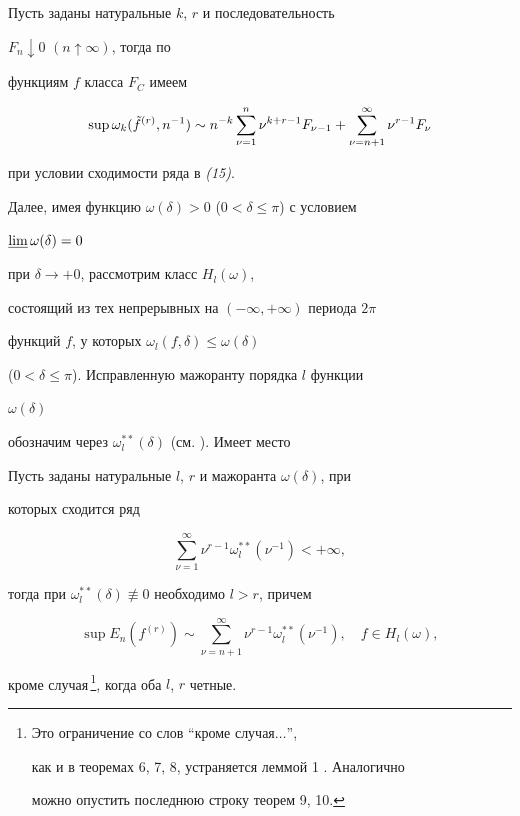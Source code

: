 \begin{thm}


Пусть заданы натуральные $k$, $r$ и последовательность


$F_n\downarrow 0$ $(n\uparrow \infty)$, тогда по


функциям $f$ класса $F_C$ имеем


\begin{equation}


\sup\omega_k(\Tilde f^{(r)},n^{-1})\sim n^{-k}\sum^n_{\nu=1}


\nu^{k+r-1}F_{\nu-1}+\sum^\infty_{\nu=n+1}\nu^{r-1}F_\nu


\end{equation}


при условии сходимости ряда в {\em (15)}.


\end{thm}





Далее, имея функцию $\omega(\delta)>0$ ($0<\delta\le\pi$) с условием


$\varliminf\omega(\delta)=0$


при $\delta\to+0$, рассмотрим класс $H_l(\omega)$,


состоящий из тех непрерывных на $(-\infty,+\infty)$ периода $2\pi$


функций $f$, у которых $\omega_l(f,\delta)\le\omega(\delta)$


($0<\delta\le\pi$). Исправленную мажоранту порядка $l$ функции


$\omega(\delta)$


обозначим через $\omega^{**}_l(\delta)$ (см. \cite{St}). Имеет место





\begin{thm}


Пусть заданы натуральные $l$, $r$ и мажоранта $\omega(\delta)$, при


которых сходится ряд


\begin{equation}


\sum^\infty_{\nu=1}\nu^{r-1}\omega^{**}_l(\nu^{-1})<+\infty,


\end{equation}


тогда при $\omega^{**}_l(\delta)\not\equiv 0$ необходимо $l>r$, причем


\begin{equation}


\sup E_n(f^{(r)})\sim \sum^\infty_{\nu=n+1}\nu^{r-1}


\omega^{**}_l(\nu^{-1}),\quad f\in H_l(\omega),


\end{equation}


кроме случая\,\footnote{Это ограничение со слов ``кроме случая$\dotsc$'',


как и в теоремах 6, 7, 8, устраняется леммой 1 \cite{Ge3}. Аналогично


можно опустить последнюю строку теорем 9, 10.}, когда оба $l$, $r$ четные.


\end{thm}


